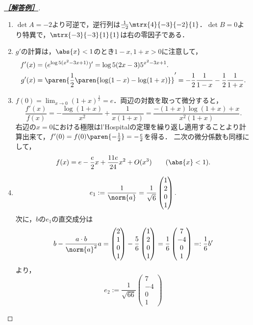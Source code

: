\documentclass[uplatex,dvipdfmx]{jsarticle}
\begin{document}
\begin{proof}[\textbf{\underline{［解答例］}}]\mbox{}
    \begin{enumerate}
        \item $\det A=-2$より可逆で，逆行列は$\frac{1}{-2}\mtrx{4}{-3}{-2}{1}$．$\det B=0$より特異で，$\mtrx{-3}{-3}{1}{1}$は右の零因子である．
        \item $g'$の計算は，$\abs{x}<1$のとき$1-x,1+x>0$に注意して，
        \begin{align*}
            f'(x)&=(e^{\log 5(x^2-3x+1)})'=\log 5(2x-3)5^{x^2-3x+1}.\\
            g'(x)&=\paren{\frac{1}{2}\paren{\log(1-x)-\log(1+x)}}'=-\frac{1}{2}\frac{1}{1-x}-\frac{1}{2}\frac{1}{1+x}.
        \end{align*}
        \item $f(0)=\lim_{x\to 0}(1+x)^{\frac{1}{x}}=e$．両辺の対数を取って微分すると，
        \[\frac{f'(x)}{f(x)}=-\frac{\log(1+x)}{x^2}+\frac{1}{x(1+x)}=\frac{-(1+x)\log(1+x)+x}{x^2(1+x)}.\]
        右辺の$x=0$における極限はl'Hospitalの定理を繰り返し適用することより計算出来て，$f'(0)=f(0)\paren{-\frac{1}{2}}=-\frac{e}{2}$を得る．
        二次の微分係数も同様にして，
        \[f(x)=e-\frac{e}{2}x+\frac{11e}{24}x^2+O(x^3)\qquad(\abs{x}<1).\]
        \item \[e_1:=\frac{1}{\norm{a}}=\frac{1}{\sqrt{6}}
        \begin{pmatrix}
            1\\2\\0\\1
        \end{pmatrix}.\]
        次に，$b$の$e_1$の直交成分は
        \[b-\frac{a\cdot b}{\norm{a}^2}a=\begin{pmatrix}
            2\\1\\0\\1
        \end{pmatrix}-\frac{5}{6}\begin{pmatrix}
            1\\2\\0\\1
        \end{pmatrix}=\frac{1}{6}\begin{pmatrix}7\\-4\\0\\1\end{pmatrix}=:\frac{1}{6}b'\]
        より，
        \[e_2:=\frac{1}{\sqrt{66}}\begin{pmatrix}7\\-4\\0\\1\end{pmatrix}\]

\end{enumerate}
\end{proof}
\end{document}
